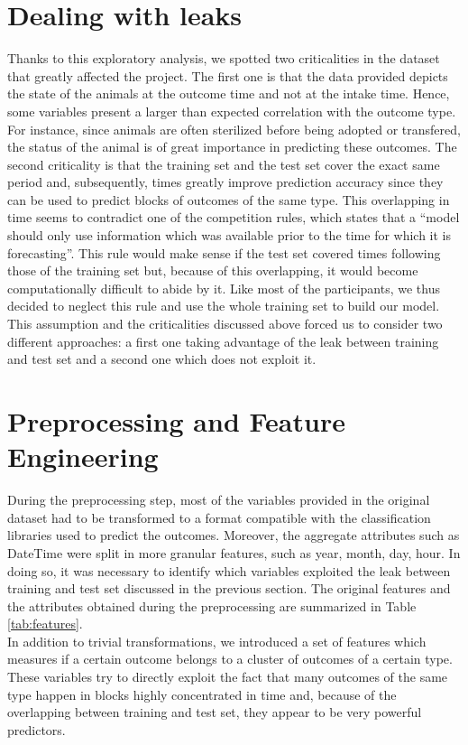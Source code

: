 \documentclass[a4paper,11pt]{article}
\begin{document}
\section{Dealing with leaks}
Thanks to this exploratory analysis, we spotted two criticalities in the dataset that greatly affected the project. The first one is that the data provided depicts the state of the animals at the outcome time and not at the intake time. Hence, some variables present a larger than expected correlation with the outcome type. For instance, since animals are often sterilized before being adopted or transfered, the status of the animal is of great importance in predicting these outcomes. The second criticality is that the training set and the test set cover the exact same period and, subsequently, times greatly improve prediction accuracy since they can be used to predict blocks of outcomes of the same type. This overlapping in time seems to contradict one of the competition rules, which states that a ``model should only use information which was available prior to the time for which it is forecasting''. This rule would make sense if the test set covered times following those of the training set but, because of this overlapping, it would become computationally difficult to abide by it. Like most of the participants, we thus decided to neglect this rule and use the whole training set to build our model. This assumption and the criticalities discussed above forced us to consider two different approaches: a first one taking advantage of the leak between training and test set and a second one which does not exploit it. 


\section{Preprocessing and Feature Engineering}
During the preprocessing step, most of the variables provided in the original dataset had to be transformed to a format compatible with the classification libraries used to predict the outcomes. Moreover, the aggregate attributes such as DateTime were split in more granular features, such as year, month, day, hour. In doing so, it was necessary to identify which variables exploited the leak between training and test set discussed in the previous section. The original features and the attributes obtained during the preprocessing are summarized in Table \ref{tab:features}.\\
In addition to trivial transformations, we introduced a set of features which measures if a certain outcome belongs to a cluster of outcomes of a certain type. These variables try to directly exploit the fact that many outcomes of the same type happen in blocks highly concentrated in time and, because of the overlapping between training and test set, they appear to be very powerful predictors. 
\end{document}
